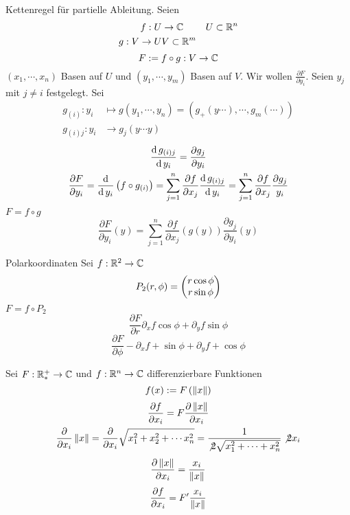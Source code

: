 \begin{Bem}
  Kettenregel für partielle Ableitung. Seien
  \begin{align*}
    f:U&\to\mathbb{C}&U\subset\mathbb{R}^n\\
    g:V\to U&V\subset\mathbb{R}^m
  \end{align*}
  \[F:=f\circ g:V\to\mathbb{C}\]
  $(x_1,\cdots,x_n)$ Basen auf $U$ und $(y_1,\cdots,y_m)$ Basen auf $V$. Wir wollen $\frac{\partial F}{\partial y_i}$. Seien $y_j$ mit $j\neq i$ festgelegt. Sei
  \begin{align*}
  g_{(i)}:y_i&\mapsto g(y_1,\cdots,y_n)=\left( g_+(y\cdots),\cdots,g_m(\cdots) \right)\\
  g_{(i)j}:y_i&\to g_j(y\cdots y)
  \end{align*}
  \begin{gather*}
    \frac{\operatorname{d} g_{(i)j}}{\operatorname{d} y_i}=\frac{\partial g_j}{\partial y_i}\\
    \frac{\partial F}{\partial y_i}=\frac{\operatorname{d}}{\operatorname{d} y_i}\left( f\circ g_{(i)} \right)=\sum^n_{j=1}\frac{\partial f}{\partial x_j}\frac{\operatorname{d} g_{(i)j}}{\operatorname{d} y_i}=\sum^n_{j=1}\frac{\partial f}{\partial x_j}\frac{\partial g_j}{y_i}
  \end{gather*}
  $F=f\circ g$
  \[\frac{\partial F}{\partial y_i}(y)=\sum^n_{j=1}\frac{\partial f}{\partial x_j}\left( g(y) \right)\frac{\partial g_j}{\partial y_i}(y)\]
\end{Bem}
\begin{Bsp}{Polarkoordinaten}
  Sei $f:\mathbb{R}^2\to\mathbb{C}$
  \[P_2(r,\phi)=\begin{pmatrix}r\cos \phi\\r\sin\phi\end{pmatrix}\]
  $F=f\circ P_2$
  \[\frac{\partial F}{\partial r}\partial_xf\cos\phi+\partial_yf\sin\phi\]
  \[\frac{\partial F}{\partial \phi}-\partial_xf+\sin\phi+\partial_yf+\cos\phi\]
\end{Bsp}
\begin{Bsp}
  Sei $F:\mathbb{R}^+_*\to\mathbb{C}$ und $f:\mathbb{R}^n\to\mathbb{C}$ differenzierbare Funktionen
  \[f(x):=F\left( \left\| x \right\| \right)\]
  \begin{gather*}
    \frac{\partial f}{\partial x_i}=F\frac{\partial\left\| x \right\|}{\partial x_i}\\
    \frac{\partial}{\partial x_i}\left\| x \right\|=\frac{\partial}{\partial x_i}\sqrt{x_1^2+x_2^2+\cdots x_n^2}=\frac{1}{\not2\sqrt{x_1^2+\cdots+x_n^2}}\not 2x_i
  \end{gather*}
  \[\dfrac{\partial \left\| x \right\|}{\partial x_i}=\frac{x_i}{\left\| x \right\|}\]
  \[\dfrac{\partial f}{\partial x_i}=F'\frac{x_i}{\left\| x \right\|}\]
\end{Bsp}
